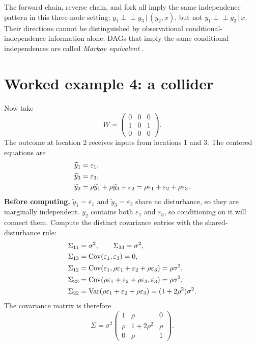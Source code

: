 \documentclass[11pt,a4paper]{article}
\newcommand{\Cov}{\operatorname{Cov}}
\newcommand{\Var}{\operatorname{Var}}
\newcommand{\indep}{\mathrel{\perp\!\!\!\perp}}
\newcommand{\given}{\,\vert\,}
\newcommand{\yt}{\widetilde y}
\begin{document}
The forward chain, reverse chain, and fork all imply the same independence pattern in this three-node setting: $y_1\indep y_3\given(y_2,x)$, but not $y_1\indep y_3\given x$. Their directions cannot be distinguished by observational conditional-independence information alone. DAGs that imply the same conditional independences are called \emph{Markov equivalent} \cite{vermapearl}.

\section{Worked example 4: a collider}

Now take
\begin{equation}
 W=\begin{pmatrix}0&0&0\\1&0&1\\0&0&0\end{pmatrix}.\label{eq:wcoll}
\end{equation}
The outcome at location 2 receives inputs from locations 1 and 3. The centered equations are
\begin{align}
 \yt_1&=\varepsilon_1,\notag\\
 \yt_3&=\varepsilon_3,\notag\\
 \yt_2&=\rho\yt_1+\rho\yt_3+\varepsilon_2=\rho\varepsilon_1+\varepsilon_2+\rho\varepsilon_3.\label{eq:collcenter}
\end{align}
\textbf{Before computing.} $\yt_1=\varepsilon_1$ and $\yt_3=\varepsilon_3$ share no disturbance, so they are marginally independent. $\yt_2$ contains both $\varepsilon_1$ and $\varepsilon_3$, so conditioning on it will connect them. Compute the distinct covariance entries with the shared-disturbance rule:
\begin{align}
\Sigma_{11}&=\sigma^2,\qquad
\Sigma_{33}=\sigma^2,\notag\\
\Sigma_{13}&=\Cov(\varepsilon_1,\varepsilon_3)=0,\notag\\
\Sigma_{12}&=\Cov(\varepsilon_1,\rho\varepsilon_1+\varepsilon_2+\rho\varepsilon_3)=\rho\sigma^2,\notag\\
\Sigma_{23}&=\Cov(\rho\varepsilon_1+\varepsilon_2+\rho\varepsilon_3,\varepsilon_3)=\rho\sigma^2,\notag\\
\Sigma_{22}&=\Var(\rho\varepsilon_1+\varepsilon_2+\rho\varepsilon_3)
 =(1+2\rho^2)\sigma^2.\label{eq:collmom}
\end{align}
The covariance matrix is therefore
\begin{equation}
\Sigma=\sigma^2\begin{pmatrix}
1&\rho&0\\\rho&1+2\rho^2&\rho\\0&\rho&1
\end{pmatrix}.
\end{equation}
\end{document}
